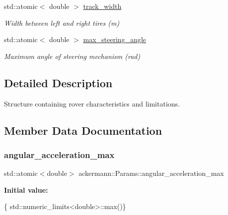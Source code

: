 \begin{DoxyCompactItemize}
\mbox{\label{structackermann_1_1_params_a429093b21328bce330f930f55c1e3b3c}} 
std\+::atomic$<$ double $>$ \hyperlink{structackermann_1_1_params_a429093b21328bce330f930f55c1e3b3c}{track\+\_\+width}
\begin{DoxyCompactList}\small\item\em Width between left and right tires (m) \end{DoxyCompactList}\item 
\mbox{\label{structackermann_1_1_params_a7bfb774e679c8e5372ec512a62f5d0ce}} 
std\+::atomic$<$ double $>$ \hyperlink{structackermann_1_1_params_a7bfb774e679c8e5372ec512a62f5d0ce}{max\+\_\+steering\+\_\+angle}
\begin{DoxyCompactList}\small\item\em Maximum angle of steering mechanism (rad) \end{DoxyCompactList}\end{DoxyCompactItemize}


\subsection{Detailed Description}
Structure containing rover characteristics and limitations. 

\subsection{Member Data Documentation}
\mbox{\label{structackermann_1_1_params_a69fd058a9c869f1db12b030a99f3141d}} 
\subsubsection{\texorpdfstring{angular\+\_\+acceleration\+\_\+max}{angular\_acceleration\_max}}
{\footnotesize\ttfamily std\+::atomic$<$double$>$ ackermann\+::\+Params\+::angular\+\_\+acceleration\+\_\+max}

{\bfseries Initial value\+:}
\begin{DoxyCode}
\{
    std::numeric\_limits<double>::max()\}
\end{DoxyCode}


